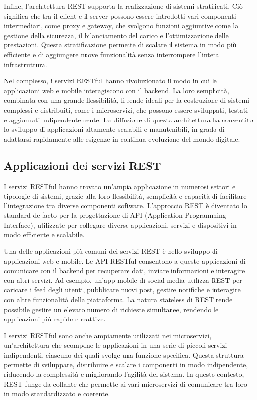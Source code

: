 \documentclass[a4paper,twoside,12pt]{toptesi}
\begin{document}
Infine, l'architettura REST supporta la realizzazione di sistemi stratificati. Ciò significa che tra il client e il server possono essere introdotti vari componenti intermediari, come proxy e gateway, che svolgono funzioni aggiuntive come la gestione della sicurezza, il bilanciamento del carico e l'ottimizzazione delle prestazioni. Questa stratificazione permette di scalare il sistema in modo più efficiente e di aggiungere nuove funzionalità senza interrompere l'intera infrastruttura.

Nel complesso, i servizi RESTful hanno rivoluzionato il modo in cui le applicazioni web e mobile interagiscono con il backend. La loro semplicità, combinata con una grande flessibilità, li rende ideali per la costruzione di sistemi complessi e distribuiti, come i microservizi, che possono essere sviluppati, testati e aggiornati indipendentemente. La diffusione di questa architettura ha consentito lo sviluppo di applicazioni altamente scalabili e manutenibili, in grado di adattarsi rapidamente alle esigenze in continua evoluzione del mondo digitale.

\subsection{Applicazioni dei servizi REST}

I servizi RESTful hanno trovato un'ampia applicazione in numerosi settori e tipologie di sistemi, grazie alla loro flessibilità, semplicità e capacità di facilitare l'integrazione tra diverse componenti software. L'approccio REST è diventato lo standard de facto per la progettazione di API (Application Programming Interface), utilizzate per collegare diverse applicazioni, servizi e dispositivi in modo efficiente e scalabile.

Una delle applicazioni più comuni dei servizi REST è nello sviluppo di applicazioni web e mobile. Le API RESTful consentono a queste applicazioni di comunicare con il backend per recuperare dati, inviare informazioni e interagire con altri servizi. Ad esempio, un'app mobile di social media utilizza REST per caricare i feed degli utenti, pubblicare nuovi post, gestire notifiche e interagire con altre funzionalità della piattaforma. La natura stateless di REST rende possibile gestire un elevato numero di richieste simultanee, rendendo le applicazioni più rapide e reattive.

I servizi RESTful sono anche ampiamente utilizzati nei microservizi, un'architettura che scompone le applicazioni in una serie di piccoli servizi indipendenti, ciascuno dei quali svolge una funzione specifica. Questa struttura permette di sviluppare, distribuire e scalare i componenti in modo indipendente, riducendo la complessità e migliorando l'agilità del sistema. In questo contesto, REST funge da collante che permette ai vari microservizi di comunicare tra loro in modo standardizzato e coerente.
\end{document}
